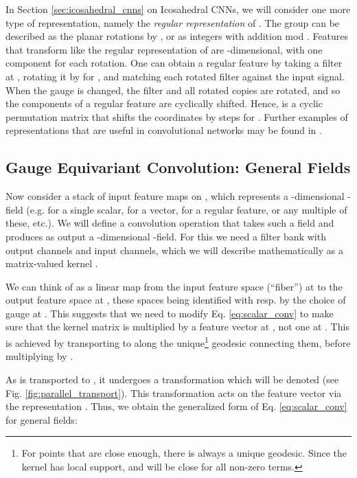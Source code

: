 \documentclass{article}
\begin{document}
In Section \ref{sec:icosahedral_cnns} on Icosahedral CNNs, we will consider one more type of representation, namely the \emph{regular representation} of .
The group  can be described as the  planar rotations by , or as integers  with addition mod .
Features that transform like the regular representation of  are -dimensional, with one component for each rotation.
One can obtain a regular feature by taking a filter at , rotating it by  for , and matching each rotated filter against the input signal.
When the gauge is changed, the filter and all rotated copies are rotated, and so the components of a regular  feature are cyclically shifted.
Hence,  is a  cyclic permutation matrix that shifts the coordinates by  steps for .
Further examples of representations  that are useful in convolutional networks may be found in \cite{cohenSteerableCNNs2017,weiler3DSteerableCNNs2018, thomasTensorFieldNetworks2018, hyPredictingMolecularProperties2018}.


\subsection{Gauge Equivariant Convolution: General Fields}

Now consider a stack of  input feature maps on , which represents a -dimensional -field (e.g.  for a single scalar,  for a vector,  for a regular  feature, or any multiple of these, etc.).
We will define a convolution operation that takes such a field and produces as output a -dimensional -field.
For this we need a filter bank with  output channels and  input channels, which we will describe mathematically as a matrix-valued kernel .

We can think of  as a linear map from the input feature space (``fiber'') at  to the output feature space at , these spaces being identified with  resp.  by the choice of gauge  at .
This suggests that we need to modify Eq. \ref{eq:scalar_conv} to make sure that the kernel matrix  is multiplied by a feature vector at , not one at .
This is achieved by transporting  to  along the unique\footnote{For points that are close enough, there is always a unique geodesic. Since the kernel has local support,  and  will be close for all non-zero terms.} geodesic connecting them, before multiplying by .

As  is transported to , it undergoes a transformation which will be denoted  (see Fig. \ref{fig:parallel_transport}).
This transformation acts on the feature vector  via the representation .
Thus, we obtain the generalized form of Eq. \ref{eq:scalar_conv} for general fields:
\end{document}
